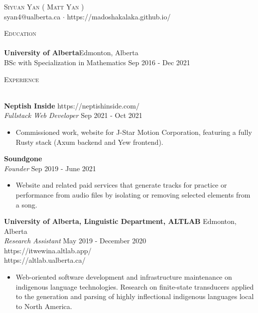 \documentclass[a4paper]{article}
\newcommand{\lineunder} {
    \vspace*{-8pt} \\
    \hspace*{-18pt} \hrulefill \\
}
\newcommand{\header} [1] {
    {\hspace*{-18pt}\vspace*{6pt} \textsc{#1}}
    \vspace*{-6pt} \lineunder
}
\begin{document}
\vspace*{-40pt}

    

\vspace*{-10pt}
\begin{center}
	{\Huge \scshape {Siyuan Yan ( Matt Yan )}}\\
	syan4@ualberta.ca $\cdot$ https://madoshakalaka.github.io/\\
\end{center}

\header{Education}
\textbf{University of Alberta}\hfill Edmonton, Alberta\\
BSc with Specialization in Mathematics \hfill Sep 2016 - Dec 2021\\
\vspace{2mm}

\header{Experience}
\vspace{1mm}

\textbf{Neptish Inside} \hfill https://neptishinside.com/\\
\textit{Fullstack Web Developer} \hfill Sep 2021 - Oct 2021\\
\vspace{-1mm}
\begin{itemize} \itemsep 1pt
\item Commissioned work, website for J-Star Motion Corporation, featuring a fully Rusty stack (Axum backend and Yew frontend).
\end{itemize}

\textbf{Soundgone}\\
\textit{Founder} \hfill Sep 2019 - June 2021\\
\vspace{-1mm}
\begin{itemize} \itemsep 1pt
\item Website and related paid services that generate tracks for practice or performance from audio files by isolating or removing selected elements from a song.
\end{itemize}
\textbf{University of Alberta, Linguistic Department, ALTLAB} \hfill Edmonton, Alberta\\
\textit{Research Assistant} \hfill May 2019 - December 2020\\
\hfill https://itwewina.altlab.app/\\
\hfill https://altlab.ualberta.ca/\\
\vspace{-1mm}
\begin{itemize} \itemsep 1pt
	\item Web-oriented software development and infrastructure maintenance on indigenous language technologies.
	Research on finite-state transducers applied to the generation and parsing of highly inflectional indigenous languages local to North America.
\end{itemize}
\end{document}
